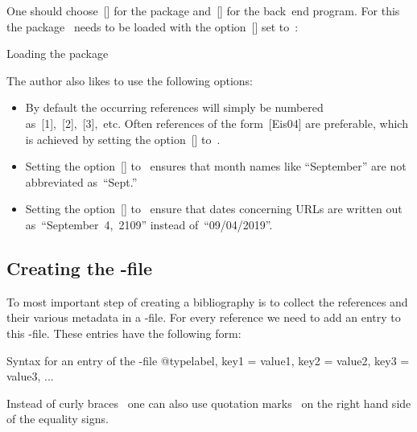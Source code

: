 One should choose~[\packname] for the package and~[\appname] for the back~end program.
For this the package~ needs to be loaded with the option~[\optname] set to~:
\begin{showcode}{Loading the package~}
\usepackage[backend = biber]{biblatex}
\end{showcode}
The author also likes to use the following options:
\begin{itemize}
  \item
    By default the occurring references will simply be numbered as~[1],~[2],~[3],~etc\@.
    Often references of the form~[Eis04] are preferable, which is achieved by setting the option~[\optname] to~.
  \item
    Setting the option~[\optname] to~ ensures that month names like \enquote{September} are not abbreviated as~\enquote{Sept.}
  \item
    Setting the option~[\optname] to~ ensure that dates concerning URLs are written out as~\enquote{September~4,~2109} instead of~\enquote{09/04/2019}.
\end{itemize}



\subsection{Creating the -file}

To most important step of creating a bibliography is to collect the references and their various metadata in a -file.
For every reference we need to add an entry to this -file.
These entries have the following form:
\begin{showcode}[label = {syntax of bib entry}]{Syntax for an entry of the -file}
@type{label,
  key1 = {value1},
  key2 = {value2},
  key3 = {value3},
  ...
}
\end{showcode}
Instead of curly braces~\inlinecode{\{ \}} one can also use quotation marks~ on the right hand side of the equality signs.


